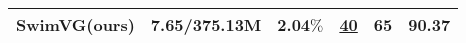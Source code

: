 \begin{table}
\begin{center}
{\begin{tabular}{c|c|c|c|c|c}
    
    
    \midrule
    \textbf{SwimVG}(ours)  & {7.65/375.13M}    & \textbf{2.04$\%$}  & {\underline{40}}       & {\textbf{65}}  & \textbf{90.37} \\  %
    \bottomrule
\end{tabular}%
}
\end{center}


\vspace{-11pt}	
\end{table}


